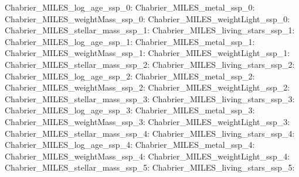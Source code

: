 Chabrier\_MILES\_log\_age\_ssp\_0:  \newline 
Chabrier\_MILES\_metal\_ssp\_0:  \newline 
Chabrier\_MILES\_weightMass\_ssp\_0:  \newline 
Chabrier\_MILES\_weightLight\_ssp\_0:  \newline 
Chabrier\_MILES\_stellar\_mass\_ssp\_1:  \newline 
Chabrier\_MILES\_living\_stars\_ssp\_1:  \newline 
Chabrier\_MILES\_log\_age\_ssp\_1:  \newline 
Chabrier\_MILES\_metal\_ssp\_1:  \newline 
Chabrier\_MILES\_weightMass\_ssp\_1:  \newline 
Chabrier\_MILES\_weightLight\_ssp\_1:  \newline 
Chabrier\_MILES\_stellar\_mass\_ssp\_2:  \newline 
Chabrier\_MILES\_living\_stars\_ssp\_2:  \newline 
Chabrier\_MILES\_log\_age\_ssp\_2:  \newline 
Chabrier\_MILES\_metal\_ssp\_2:  \newline 
Chabrier\_MILES\_weightMass\_ssp\_2:  \newline 
Chabrier\_MILES\_weightLight\_ssp\_2:  \newline 
Chabrier\_MILES\_stellar\_mass\_ssp\_3:  \newline 
Chabrier\_MILES\_living\_stars\_ssp\_3:  \newline 
Chabrier\_MILES\_log\_age\_ssp\_3:  \newline 
Chabrier\_MILES\_metal\_ssp\_3:  \newline 
Chabrier\_MILES\_weightMass\_ssp\_3:  \newline 
Chabrier\_MILES\_weightLight\_ssp\_3:  \newline 
Chabrier\_MILES\_stellar\_mass\_ssp\_4:  \newline 
Chabrier\_MILES\_living\_stars\_ssp\_4:  \newline 
Chabrier\_MILES\_log\_age\_ssp\_4:  \newline 
Chabrier\_MILES\_metal\_ssp\_4:  \newline 
Chabrier\_MILES\_weightMass\_ssp\_4:  \newline 
Chabrier\_MILES\_weightLight\_ssp\_4:  \newline 
Chabrier\_MILES\_stellar\_mass\_ssp\_5:  \newline 
Chabrier\_MILES\_living\_stars\_ssp\_5:  \newline 
